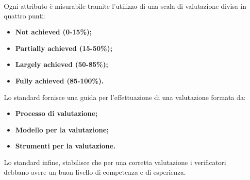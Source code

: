 	Ogni attributo è misurabile tramite l'utilizzo di una scala di valutazione divisa in quattro punti:
		\begin{itemize}
			\item \textbf{Not achieved (0-15\%);}
			\item \textbf{Partially achieved (15-50\%);}
			\item \textbf{Largely achieved (50-85\%);}
			\item \textbf{Fully achieved (85-100\%).}
		\end{itemize}
	Lo standard fornisce una guida per l'effettuazione di una valutazione formata da:
		\begin{itemize}
			\item \textbf{Processo di valutazione;}
			\item \textbf{Modello per la valutazione;}
			\item \textbf{Strumenti per la valutazione.}
		\end{itemize}
	Lo standard infine, stabilisce che per una corretta valutazione i verificatori debbano avere un buon livello di competenza e di esperienza.
	
\pagebreak